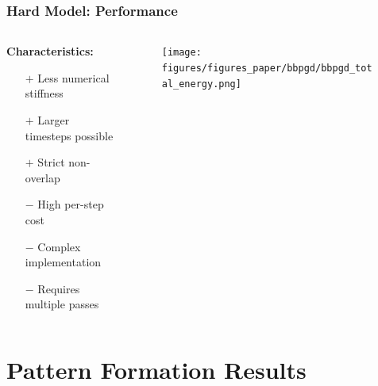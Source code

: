 \documentclass[10pt,t]{beamer}
\begin{document}
\begin{frame}
    \frametitle{Hard Model: Performance}

    \vspace{0.8cm}

    \begin{columns}[c]
        \begin{column}{0.45\textwidth}
            \textbf{Characteristics:}
            \begin{itemize}
                \item[$+$] Less numerical stiffness
                \item[$+$] Larger timesteps possible
                \item[$+$] Strict non-overlap
                \item[$-$] High per-step cost
                \item[$-$] Complex implementation
                \item[$-$] Requires multiple passes
            \end{itemize}
        \end{column}

        \begin{column}{0.6\textwidth}
            \begin{figure}
                \centering
                \texttt{[image: figures/figures\_paper/bbpgd/bbpgd\_total\_energy.png]}
            \end{figure}
        \end{column}
    \end{columns}

\end{frame}


\section{Pattern Formation Results}
\end{document}
